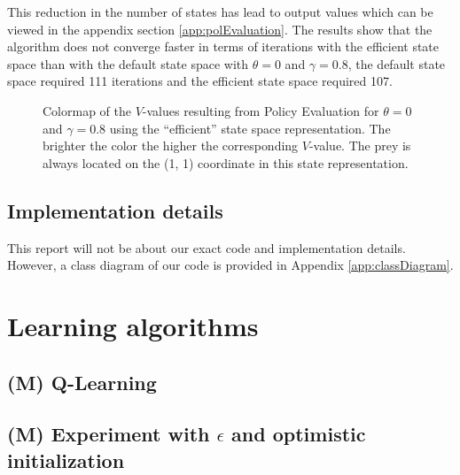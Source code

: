 \documentclass{article}
\begin{document}
This reduction in the number of states has lead to output values which can be viewed in the appendix section \ref{app:polEvaluation}. The results show that the algorithm does not converge faster in terms of iterations with the efficient state space than with the default state space with $\theta=0$ and $\gamma=0.8$, the default state space required 111 iterations and the efficient state space required 107. 

\begin{figure}[htbp]
        \caption{\label{NewStateRep} Colormap of the $V$-values  resulting from Policy Evaluation for $\theta=0$ and $\gamma = 0.8$ \newline using the ``efficient'' state space representation. The brighter the color the higher the corresponding $V$-value. The prey is always located on the (1, 1) coordinate in this state representation.}
\end{figure}

\subsection{Implementation details}
This report will not be about our exact code and implementation details. However, a class diagram of our code is provided in Appendix \ref{app:classDiagram}.

\section{Learning algorithms}
\subsection{(M) Q-Learning}
\subsection{(M) Experiment with $\epsilon$ and optimistic initialization}
\end{document}
